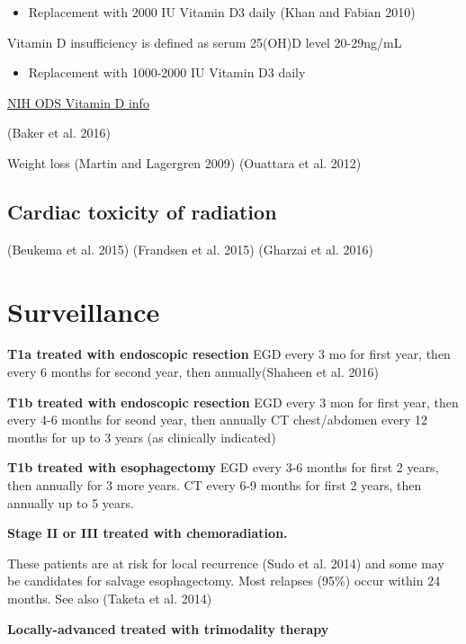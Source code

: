 \documentclass[
  letterpaper,
]{scrbook}
\providecommand{\tightlist}{%
  \setlength{\itemsep}{0pt}\setlength{\parskip}{0pt}}
\begin{document}
\begin{itemize}
\tightlist
\item
  Replacement with 2000 IU Vitamin D3 daily (Khan and Fabian 2010)
\end{itemize}

Vitamin D insufficiency is defined as serum 25(OH)D level 20-29ng/mL

\begin{itemize}
\tightlist
\item
  Replacement with 1000-2000 IU Vitamin D3 daily
\end{itemize}

\href{https://ods.od.nih.gov/factsheets/vitamind-healthprofessional/}{NIH
ODS Vitamin D info}

(Baker et al. 2016)

Weight loss (Martin and Lagergren 2009) (Ouattara et al. 2012)

\section{Cardiac toxicity of
radiation}\label{cardiac-toxicity-of-radiation}

(Beukema et al. 2015) (Frandsen et al. 2015) (Gharzai et al. 2016)

\chapter{Surveillance}\label{eso_surveillance}

\textbf{T1a treated with endoscopic resection} EGD every 3 mo for first
year, then every 6 months for second year, then annually(Shaheen et al.
2016)

\textbf{T1b treated with endoscopic resection} EGD every 3 mon for first
year, then every 4-6 months for seond year, then annually CT
chest/abdomen every 12 months for up to 3 years (as clinically
indicated)

\textbf{T1b treated with esophagectomy} EGD every 3-6 months for first 2
years, then annually for 3 more years. CT every 6-9 months for first 2
years, then annually up to 5 years.

\textbf{Stage II or III treated with chemoradiation.}

These patients are at risk for local recurrence (Sudo et al. 2014) and
some may be candidates for salvage esophagectomy. Most relapses (95\%)
occur within 24 months. See also (Taketa et al. 2014)

\textbf{Locally-advanced treated with trimodality therapy}
\end{document}
